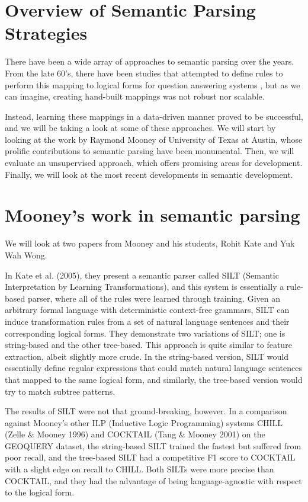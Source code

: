 \documentclass[a4paper]{article}
\theoremstyle{definition}
\begin{document}
\section{Overview of Semantic Parsing Strategies}

\quad There have been a wide array of approaches to semantic parsing over the years. From the late 60's, there have been studies that attempted to define rules to perform this mapping to logical forms for question answering systems \cite{Woods77}, but as we can imagine, creating hand-built mappings was not robust nor scalable.

\quad Instead, learning these mappings in a data-driven manner proved to be successful, and we will be taking a look at some of these approaches. We will start by looking at the work by Raymond Mooney of University of Texas at Austin, whose prolific contributions to semantic parsing have been monumental. Then, we will evaluate an unsupervised approach, which offers promising areas for development. Finally, we will look at the most recent developments in semantic development.

\section{Mooney's work in semantic parsing}

We will look at two papers from Mooney and his students, Rohit Kate and Yuk Wah Wong.

\quad In Kate et al. (2005), they present a semantic parser called SILT (Semantic Interpretation by Learning Transformations), and this system is essentially a rule-based parser, where all of the rules were learned through training. Given an arbitrary formal language with deterministic context-free grammars, SILT can induce transformation rules from a set of natural language sentences and their corresponding logical forms. They demonstrate two variations of SILT; one is string-based and the other tree-based. This approach is quite similar to feature extraction, albeit slightly more crude. In the string-based version, SILT would essentially define regular expressions that could match natural language sentences that mapped to the same logical form, and similarly, the tree-based version would try to match subtree patterns.

\quad The results of SILT were not that ground-breaking, however. In a comparison against Mooney's other ILP (Inductive Logic Programming) systems CHILL (Zelle \& Mooney 1996) and COCKTAIL (Tang \& Mooney 2001) on the GEOQUERY dataset, the string-based SILT trained the fastest but suffered from poor recall, and the tree-based SILT had a competitive F1 score to COCKTAIL with a slight edge on recall to CHILL. Both SILTs were more precise than COCKTAIL, and they had the advantage of being language-agnostic with respect to the logical form.
\end{document}
